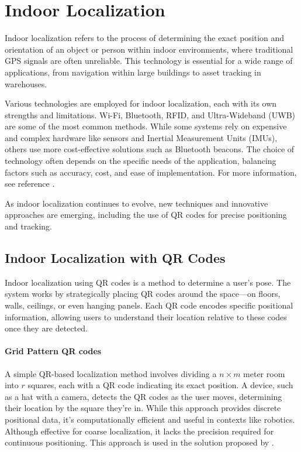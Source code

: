 \section{Indoor Localization}

Indoor localization refers to the process of determining the exact position and orientation of an object or person within indoor environments, where traditional GPS signals are often unreliable. This technology is essential for a wide range of applications, from navigation within large buildings to asset tracking in warehouses.

Various technologies are employed for indoor localization, each with its own strengths and limitations. Wi-Fi, Bluetooth, RFID, and Ultra-Wideband (UWB) are some of the most common methods. While some systems rely on expensive and complex hardware like sensors and Inertial Measurement Units (IMUs), others use more cost-effective solutions such as Bluetooth beacons. The choice of technology often depends on the specific needs of the application, balancing factors such as accuracy, cost, and ease of implementation. For more information, see reference \cite{leitch2023}.

As indoor localization continues to evolve, new techniques and innovative approaches are emerging, including the use of QR codes for precise positioning and tracking. 

\subsection{Indoor Localization with QR Codes}

Indoor localization using QR codes is a method to determine a user’s pose. The system works by strategically placing QR codes around the space—on floors, walls, ceilings, or even hanging panels. Each QR code encodes specific positional information, allowing users to understand their location relative to these codes once they are detected.

\paragraph{Grid Pattern QR codes}

A simple QR-based localization method involves dividing a $n\times m$ meter room into $r$ squares, each with a QR code indicating its exact position. A device, such as a hat with a camera, detects the QR codes as the user moves, determining their location by the square they're in. While this approach provides discrete positional data, it's computationally efficient and useful in contexts like robotics. Although effective for coarse localization, it lacks the precision required for continuous positioning. This approach is used in the solution proposed by \cite{zhang2015}.


